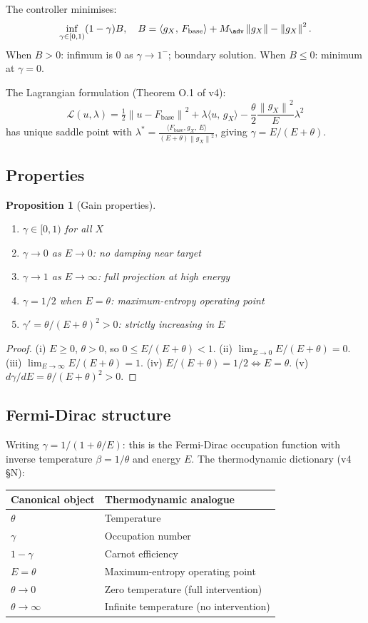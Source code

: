 \documentclass[11pt,a4paper]{article}
\newtheorem{proposition}[theorem]{Proposition}
\theoremstyle{definition}
\newcommand{\norm}[1]{\left\|#1\right\|}
\newcommand{\inner}[2]{\langle #1,\,#2\rangle}
\newcommand{\Fbase}{F_{\mathrm{base}}}
\newcommand{\gX}{g_X}
\newcommand{\half}{\tfrac{1}{2}}
\begin{document}
The controller minimises:
\[
\inf_{\gamma \in [0,1)} (1-\gamma) B, \quad B = \inner{\gX}{\Fbase} + M_\adv\norm{\gX} - \norm{\gX}^2.
\]
When $B > 0$: infimum is $0$ as $\gamma \to 1^-$; boundary solution.
When $B \leq 0$: minimum at $\gamma = 0$.

The Lagrangian formulation (Theorem O.1 of v4):
\[
\mathcal{L}(u,\lambda) = \half\norm{u - \Fbase}^2 + \lambda\inner{u}{\gX} - \frac{\theta}{2}\frac{\norm{\gX}^2}{E}\lambda^2
\]
has unique saddle point with $\lambda^* = \frac{\inner{\Fbase,\gX}E}{(E+\theta)\norm{\gX}^2}$,
giving $\gamma = E/(E+\theta)$.

\subsection{Properties}

\begin{proposition}[Gain properties]
\begin{enumerate}[label=(\roman*)]
\item $\gamma \in [0,1)$ for all $X$
\item $\gamma \to 0$ as $E \to 0$: no damping near target
\item $\gamma \to 1$ as $E \to \infty$: full projection at high energy
\item $\gamma = 1/2$ when $E = \theta$: maximum-entropy operating point
\item $\gamma' = \theta/(E+\theta)^2 > 0$: strictly increasing in $E$
\end{enumerate}
\end{proposition}

\begin{proof}
(i) $E \geq 0$, $\theta > 0$, so $0 \leq E/(E+\theta) < 1$.
(ii) $\lim_{E\to0} E/(E+\theta) = 0$.
(iii) $\lim_{E\to\infty} E/(E+\theta) = 1$.
(iv) $E/(E+\theta) = 1/2 \iff E = \theta$.
(v) $d\gamma/dE = \theta/(E+\theta)^2 > 0$.
\end{proof}

\subsection{Fermi-Dirac structure}

Writing $\gamma = 1/(1 + \theta/E)$: this is the Fermi-Dirac occupation function
with inverse temperature $\beta = 1/\theta$ and energy $E$.
The thermodynamic dictionary (v4 §N):
\begin{center}
\begin{tabular}{ll}
\toprule
Canonical object & Thermodynamic analogue \\
\midrule
$\theta$ & Temperature \\
$\gamma$ & Occupation number \\
$1-\gamma$ & Carnot efficiency \\
$E = \theta$ & Maximum-entropy operating point \\
$\theta \to 0$ & Zero temperature (full intervention) \\
$\theta \to \infty$ & Infinite temperature (no intervention) \\
\bottomrule
\end{tabular}
\end{center}
\end{document}
